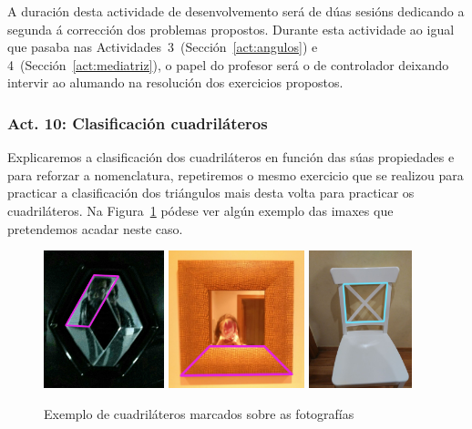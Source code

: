 
A duración desta actividade de desenvolvemento será de dúas sesións dedicando a segunda á corrección dos problemas propostos. Durante esta actividade ao igual que pasaba nas Actividades~3~(Sección~\ref{act:angulos}) e 4~(Sección~\ref{act:mediatriz}), o papel do profesor será o de controlador deixando intervir ao alumando na resolución dos exercicios propostos.

\subsubsection{Act. 10: Clasificación cuadriláteros}\label{act:cuadrilateros}
Explicaremos a clasificación dos cuadriláteros en función das súas propiedades e para reforzar a nomenclatura, repetiremos o mesmo exercicio que se realizou para practicar a clasificación dos triángulos mais desta volta para practicar os cuadriláteros. Na Figura~\ref{fig:act11} pódese ver algún exemplo das imaxes que pretendemos acadar neste caso.

\begin{figure}[h!]
  \centering
  \includegraphics[height=4cm]{img/cuad1.jpg}
  \includegraphics[height=4cm]{img/cuad2.jpg}
  \includegraphics[height=4cm]{img/cuad3.jpg}
  \caption{Exemplo de cuadriláteros marcados sobre as fotografías}\label{fig:act11}
\end{figure}

